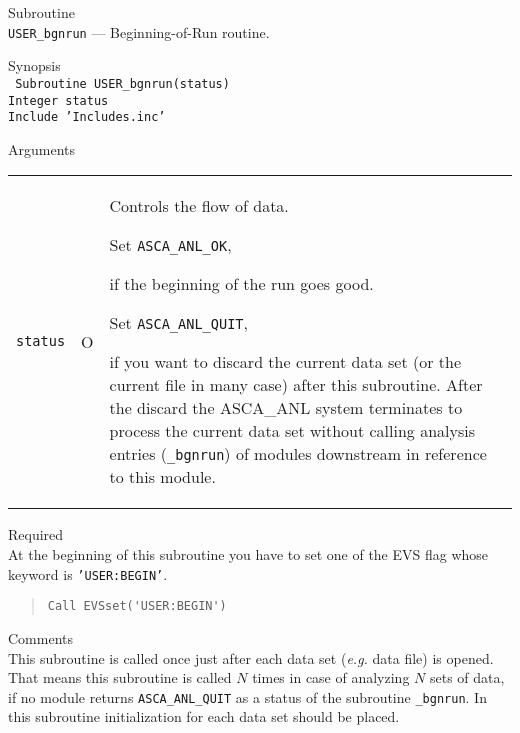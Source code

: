 \vspace{1cm}

\newpage
\begin{description}
\item{Subroutine}\\
   {\tt USER\_bgnrun} --- Beginning-of-Run routine.
\item{Synopsis}\\
   {\tt
      Subroutine USER\_bgnrun(status) \\
      Integer status \\
      Include 'Includes.inc'
   }
\item{Arguments} \\
 \begin{tabular}{l@{\ (}c@{)\ }p{}}
   {\tt status} & O & Controls the flow of data.\par
        Set {\tt ASCA\_ANL\_OK},\par
        \hfill\parbox{0.65\textwidth}{
            if the beginning of the run goes good.
        }\par
        Set {\tt ASCA\_ANL\_QUIT},\par
        \hfill\parbox{0.65\textwidth}{
            if you want to discard the current data set (or the current file
            in many case) after this subroutine.
            After the discard
            the ASCA\_ANL system terminates to process the current data set
            without calling analysis entries ({\tt *\_bgnrun}) of modules 
            downstream in reference to this module.
        }\par
 \end{tabular}
\item{Required} \\
   At the beginning of this subroutine you have to set one of the EVS flag
   whose keyword is {\tt 'USER:BEGIN'}.
\begin{quote}\baselineskip 3.2mm\begin{verbatim}
Call EVSset('USER:BEGIN')
\end{verbatim}\end{quote}
\item{Comments} \\
   This subroutine is called once
   just after each data set ({\em e.g.} data file) is opened.
   That means
   this subroutine is called $N$ times
   in case of analyzing $N$ sets of data,
   if no module returns {\tt ASCA\_ANL\_QUIT}
   as a status of the subroutine {\tt *\_bgnrun}.
   In this subroutine
   initialization for each data set should be placed.
\end{description}

